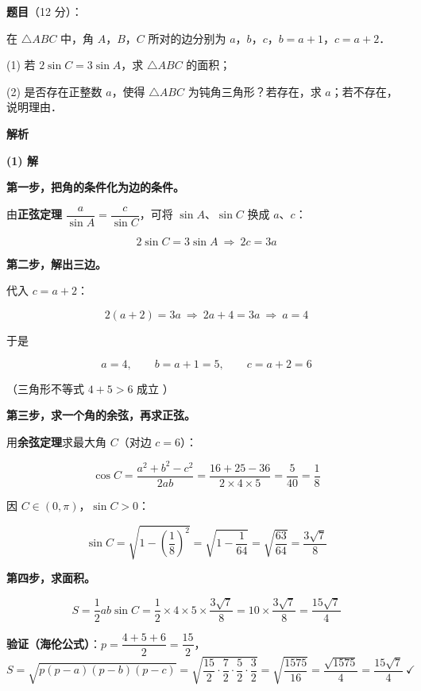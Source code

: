 \begin{answer}

\textbf{题目}（12 分）：

在 $\triangle ABC$ 中，角 $A$，$B$，$C$ 所对的边分别为 $a$，$b$，$c$，$b=a+1$，$c=a+2$．

  (1) 若 $2\sin C=3\sin A$，求 $\triangle ABC$ 的面积；

  (2) 是否存在正整数 $a$，使得 $\triangle ABC$ 为钝角三角形？若存在，求 $a$；若不存在，说明理由．

\textbf{解析}

\par\medskip

\textbf{(1) 解}

\textbf{第一步，把角的条件化为边的条件。}

由\textbf{正弦定理} $\dfrac a{\sin A}=\dfrac c{\sin C}$，可将 $\sin A$、$\sin C$ 换成 $a$、$c$：

\nopagebreak[4]
\[2\sin C=3\sin A\ \Longrightarrow\ 2c=3a\]

\textbf{第二步，解出三边。}

代入 $c=a+2$：

\nopagebreak[4]
\[2(a+2)=3a\ \Longrightarrow\ 2a+4=3a\ \Longrightarrow\ a=4\]

于是

\nopagebreak[4]
\[a=4,\qquad b=a+1=5,\qquad c=a+2=6\]

（三角形不等式 $4+5>6$ 成立 ）

\textbf{第三步，求一个角的余弦，再求正弦。}

用\textbf{余弦定理}求最大角 $C$（对边 $c=6$）：

\nopagebreak[4]
\[\cos C=\frac{a^{2}+b^{2}-c^{2}}{2ab}=\frac{16+25-36}{2\times4\times5}=\frac5{40}=\frac18\]

因 $C\in(0,\pi)$，$\sin C>0$：

\nopagebreak[4]
\[\sin C=\sqrt{1-\left(\frac18\right)^{2}}=\sqrt{1-\frac1{64}}=\sqrt{\frac{63}{64}}=\frac{3\sqrt7}8\]

\textbf{第四步，求面积。}

\nopagebreak[4]
\[S=\frac12ab\sin C=\frac12\times4\times5\times\frac{3\sqrt7}8=10\times\frac{3\sqrt7}8=\frac{15\sqrt7}4\]

\textbf{验证（海伦公式）}：$p=\dfrac{4+5+6}2=\dfrac{15}2$，
\nopagebreak[4]
\[S=\sqrt{p(p-a)(p-b)(p-c)}=\sqrt{\frac{15}2\cdot\frac72\cdot\frac52\cdot\frac32}=\sqrt{\frac{1575}{16}}=\frac{\sqrt{1575}}4=\frac{15\sqrt7}4\ \checkmark\]


\end{answer}
